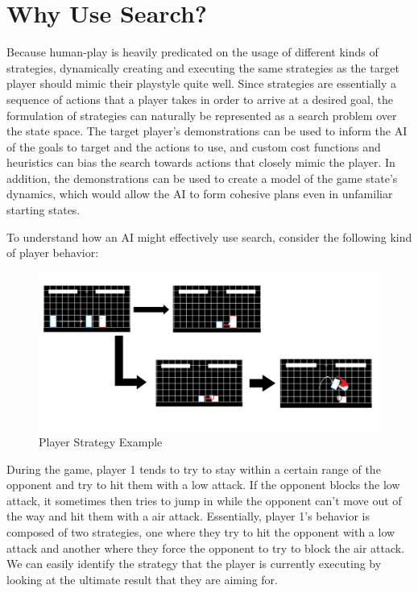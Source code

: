 \section{Why Use Search?}

Because human-play is heavily predicated on the usage of different kinds of strategies, dynamically creating and executing the same strategies as the target player should mimic their playstyle quite well. Since strategies are essentially a sequence of actions that a player takes in order to arrive at a desired goal, the formulation of strategies can naturally be represented as a search problem over the state space. The target player's demonstrations can be used to inform the AI of the goals to target and the actions to use, and custom cost functions and heuristics can bias the search towards actions that closely mimic the player. In addition, the demonstrations can be used to create a model of the game state's dynamics, which would allow the AI to form cohesive plans even in unfamiliar starting states. 

To understand how an AI might effectively use search, consider the following kind of player behavior:

\begin{figure}[h]
	\centering
	\includegraphics[width=\textwidth]{Figures/Flowchart.png}
	\caption{Player Strategy Example}
	\label{Player Strategy}
\end{figure}

During the game, player 1 tends to try to stay within a certain range of the opponent and try to hit them with a low attack. If the opponent blocks the low attack, it sometimes then tries to jump in while the opponent can't move out of the way and hit them with a air attack. Essentially, player 1's behavior is composed of two strategies, one where they try to hit the opponent with a low attack and another where they force the opponent to try to block the air attack. We can easily identify the strategy that the player is currently executing by looking at the ultimate result that they are aiming for.


